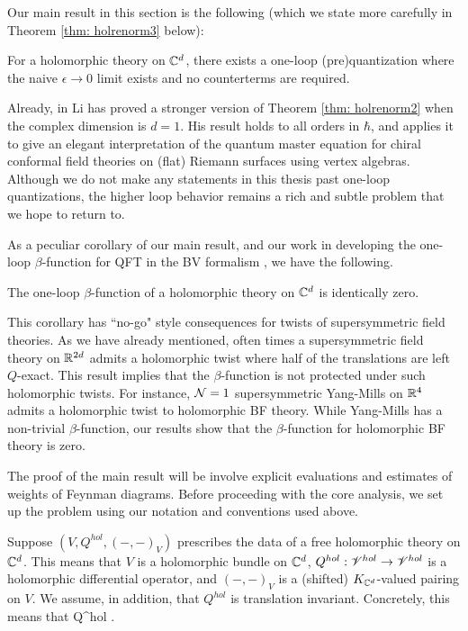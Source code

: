 \documentclass[10pt]{amsart}
\begin{document}
Our main result in this section is the following (which we state more carefully in Theorem \ref{thm: holrenorm3} below):

\begin{thm} \label{thm: holrenorm2}
For a holomorphic theory on $\mathbb C^d$, there exists a one-loop (pre)quantization where the naive $\epsilon \to 0$ limit exists and no counterterms are required.
\end{thm}

\begin{rmk}
Already, in \cite{LiVertex} Li has proved a stronger version of Theorem \ref{thm: holrenorm2} when the complex dimension is $d =1$.
His result holds to all orders in $\hbar$, and applies it to give an elegant interpretation of the quantum master equation for chiral conformal field theories on (flat) Riemann surfaces using vertex algebras.
Although we do not make any statements in this thesis past one-loop
quantizations, the higher loop behavior remains a rich and subtle problem that we hope to return to.
\end{rmk}

As a peculiar corollary of our main result, and our work in developing the one-loop $\beta$-function for QFT in the BV formalism \cite{EWY}, we have the following. 

\begin{cor}
The one-loop $\beta$-function of a holomorphic theory on $\mathbb C^d$ is identically zero. 
\end{cor}

This corollary has ``no-go" style consequences for twists of supersymmetric field theories. 
As we have already mentioned, often times a supersymmetric field theory on $\mathbb R^{2d}$ admits a holomorphic twist where half of the translations are left $Q$-exact.
This result implies that the $\beta$-function is not protected under such holomorphic twists. 
For instance, $\mathcal N=1$ supersymmetric Yang-Mills on $\mathbb R^4$ admits a holomorphic twist to holomorphic BF theory. 
While Yang-Mills has a non-trivial $\beta$-function, our results show that the $\beta$-function for holomorphic BF theory is zero. 

The proof of the main result will be involve explicit evaluations and estimates of weights of Feynman diagrams. 
Before proceeding with the core analysis, we set up the problem using our notation and conventions used above. 

Suppose $(V, Q^{hol}, (-,-)_V)$ prescribes the data of a free holomorphic theory on $\mathbb C^d$.
This means that $V$ is a holomorphic bundle on $\mathbb C^d$, $Q^{hol} : \mathscr V^{hol} \to \mathscr V^{hol}$ is a holomorphic differential operator, and $(-,-)_V$ is a (shifted) $K_{\mathbb C^d}$-valued pairing on $V$. 
We assume, in addition, that $Q^{hol}$ is translation invariant.
Concretely, this means that
\ben
Q^{hol} \in \CC {}.
\een
\end{document}
